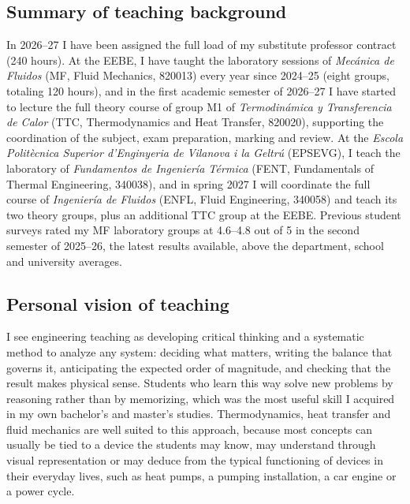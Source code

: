 \documentclass[11pt]{article}
\newcommand{\NEW}[1]{\iffinal #1\else{\color{red}#1}\fi}
\begin{document}
\subsection{Summary of teaching background}
In 2026--27 I have been assigned the full load of my substitute professor contract (240 hours). 
At the EEBE, I have taught the laboratory sessions of \textit{Mec\'anica de Fluidos} (MF, Fluid Mechanics, 820013) every year since 2024--25 (eight groups, totaling 120 hours), and in the first academic semester of 2026--27 I have started to lecture the full theory course of \NEW{group} M1 of \textit{Termodin\'amica y Transferencia de Calor} (TTC, Thermodynamics and Heat Transfer, 820020), supporting the coordination of the subject, exam preparation, marking and review. 
At the \textit{Escola Politècnica Superior d'Enginyeria de Vilanova i la Geltrú} (EPSEVG), I teach the laboratory of \textit{Fundamentos de Ingenier\'ia T\'ermica}
(FENT, Fundamentals of Thermal Engineering, 340038), and in spring 2027 I will coordinate the full course of \textit{Ingenier\'ia de Fluidos} (ENFL, Fluid Engineering, 340058) and teach its two theory groups, plus an additional TTC group at the EEBE. 
Previous student surveys rated my MF laboratory groups at 4.6--4.8 out of 5 in \NEW{the second semester of 2025--26}, the latest results available, above the department, school and
university averages.

\subsection{Personal vision of teaching}\label{sec:vision}

I see engineering teaching as developing critical thinking and a systematic method to analyze any system: deciding what matters, writing the balance that governs it, anticipating the expected order of magnitude, and checking that the result makes physical sense. 
Students who learn this way solve new problems by reasoning rather than by memorizing, which was the most useful skill I acquired in my own bachelor's and master's studies. 
Thermodynamics, heat transfer and fluid mechanics are well suited to this approach, because most concepts can usually be tied to a device the students may know, may understand through visual representation or may deduce from the typical functioning of devices in their everyday lives, such as heat pumps, a pumping installation, a car engine or a power cycle.
\end{document}
